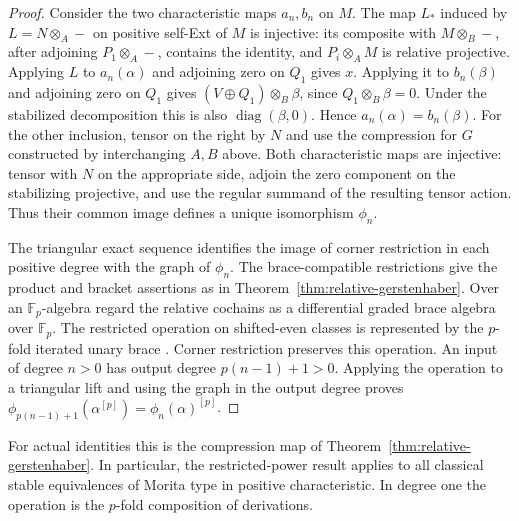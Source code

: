 \documentclass[12pt,a4paper,english,reqno]{amsart}
\numberwithin{equation}{section}
\theoremstyle{plain}
\theoremstyle{definition}
\begin{document}
\begin{proof}
Consider the two characteristic maps $a_n,b_n$ on $M$.
The map $L_*$ induced by $L=N\otimes_A-$ on positive self-Ext
of $M$ is injective: its composite with $M\otimes_B-$,
after adjoining $P_1\otimes_A-$, contains the identity,
and $P_i\otimes_A M$ is relative projective. Applying
$L$ to $a_n(\alpha)$ and adjoining zero on $Q_1$ gives $x$.
Applying it to $b_n(\beta)$ and adjoining zero on $Q_1$ gives
$(V\oplus Q_1)\otimes_B\beta$, since $Q_1\otimes_B\beta=0$.
Under the stabilized decomposition this is also
$\operatorname{diag}(\beta,0)$. Hence
$a_n(\alpha)=b_n(\beta)$. For the other inclusion, tensor
on the right by $N$ and use the compression for $G$ constructed
by interchanging $A,B$ above. Both characteristic maps are
injective: tensor with $N$ on the appropriate side, adjoin
the zero component on the stabilizing projective, and use
the regular summand of the resulting tensor action. Thus their
common image defines a unique isomorphism $\phi_n$.

The triangular exact sequence identifies the image of corner
restriction in each positive degree with the graph of $\phi_n$.
The brace-compatible restrictions give the product and bracket
assertions as in Theorem~\ref{thm:relative-gerstenhaber}.
Over an $\mathbb F_p$-algebra regard the relative cochains as
a differential graded brace algebra over $\mathbb F_p$.
The restricted operation on shifted-even classes is represented by
the $p$-fold iterated unary brace
\cite[Theorem~2 and Appendix~A]{BriggsRubio2022}.
Corner restriction preserves this operation. An input of
degree $n>0$ has output degree $p(n-1)+1>0$. Applying the
operation to a triangular lift and using the graph in the
output degree proves
$\phi_{p(n-1)+1}(\alpha^{[p]})=\phi_n(\alpha)^{[p]}$.
\end{proof}

For actual identities this is the compression map of
Theorem~\ref{thm:relative-gerstenhaber}. In particular, the
restricted-power result applies to all classical stable
equivalences of Morita type in positive characteristic. In
degree one the operation is the $p$-fold composition of derivations.
\end{document}
